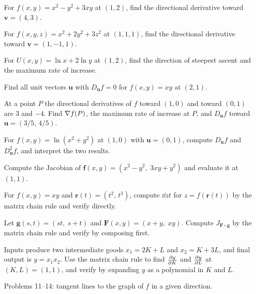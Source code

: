 \begin{problems}
  \item For $f(x,y)=x^{2}-y^{2}+3xy$ at $(1,2)$, find the directional
        derivative toward $\mathbf{v}=(4,3)$.
  \item For $f(x,y,z)=x^{2}+2y^{2}+3z^{2}$ at $(1,1,1)$, find the
        directional derivative toward $\mathbf{v}=(1,-1,1)$.
  \item For $U(x,y)=\ln x+2\ln y$ at $(1,2)$, find the direction of
        steepest ascent and the maximum rate of increase.
  \item Find all unit vectors $\mathbf{u}$ with $D_{\mathbf{u}}f=0$ for
        $f(x,y)=xy$ at $(2,1)$.
  \item At a point $P$ the directional derivatives of $f$ toward $(1,0)$
        and toward $(0,1)$ are $3$ and $-4$. Find $\nabla f(P)$, the
        maximum rate of increase at $P$, and $D_{\mathbf{u}}f$ toward
        $\mathbf{u}=(3/5,\,4/5)$.
  \item For $f(x,y)=\ln(x^{2}+y^{2})$ at $(1,0)$ with
        $\mathbf{u}=(0,1)$, compute $D_{\mathbf{u}}f$ and
        $D^{2}_{\mathbf{u}}f$, and interpret the two results.
  \item Compute the Jacobian of
        $\mathbf{f}(x,y)=(x^{2}-y^{2},\;3xy+y^{2})$ and evaluate it at
        $(1,1)$.
  \item For $f(x,y)=xy$ and $\mathbf{r}(t)=(t^{2},\,t^{3})$, compute
        $\dd{z}{t}$ for $z=f(\mathbf{r}(t))$ by the matrix chain rule
        and verify directly.
  \item Let $\mathbf{g}(s,t)=(st,\;s+t)$ and
        $\mathbf{F}(x,y)=(x+y,\;xy)$. Compute
        $J_{\mathbf{F}\circ\mathbf{g}}$ by the matrix chain rule and
        verify by composing first.
  \item Inputs produce two intermediate goods $x_{1}=2K+L$ and
        $x_{2}=K+3L$, and final output is $y=x_{1}x_{2}$. Use the matrix
        chain rule to find $\frac{\partial y}{\partial K}$ and $\frac{\partial y}{\partial L}$ at $(K,L)=(1,1)$,
        and verify by expanding $y$ as a polynomial in $K$ and $L$.
\end{problems}

Problems 11--14: tangent lines to the graph of $f$ in a given direction.

